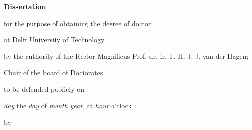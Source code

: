 \begin{titlepage}

\begin{center}

\vspace*{2\bigskipamount}

{\makeatletter
\titlestyle\bfseries\LARGE\@title
\makeatother}

{\makeatletter
\ifx\@subtitle\undefined\else
    \bigskip
    \titlefont\titleshape\Large\@subtitle
\fi
\makeatother}

\end{center}

\cleardoublepage
\thispagestyle{empty}

\begin{center}


\vspace*{2\bigskipamount}

{\makeatletter
\titlestyle\bfseries\LARGE\@title
\makeatother}

{\makeatletter
\ifx\@subtitle\undefined\else
    \bigskip
    \titlefont\titleshape\Large\@subtitle
\fi
\makeatother}

\vfill


{\Large\titlefont\bfseries Dissertation}

\bigskip
\bigskip

for the purpose of obtaining the degree of doctor

at Delft University of Technology

by the authority of the Rector Magnificus Prof. dr. ir. T. H. J. J. van der Hagen;

Chair of the board of Doctorates

to be defended publicly on

\textit{day} the \textit{day} of \textit{month}
\textit{year}, at \textit{hour} o’clock

\bigskip
\bigskip

by

\bigskip
\bigskip


\end{center}
\end{titlepage}
